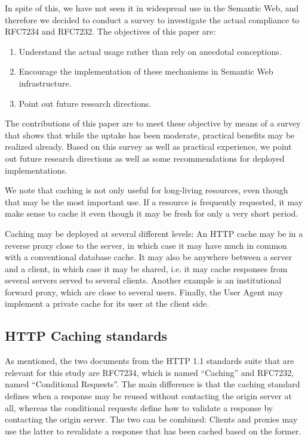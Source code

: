 \documentclass{llncs}
\begin{document}
In spite of this, we have not seen it in widespread use in the
Semantic Web, and therefore we decided to conduct a survey to
investigate the actual compliance to RFC7234 and RFC7232. 
The objectives of this paper are:
\begin{enumerate}
\item Understand the actual usage rather than rely on anecdotal
  conceptions.
\item Encourage the implementation of these mechanisms in Semantic Web
  infrastructure.
\item Point out future research directions.
\end{enumerate}
The contributions of this paper are to meet these objective by means
of a survey that shows that while the uptake has been moderate,
practical benefits may be realized already. Based on this survey as
well as practical experience, we point out future research directions
as well as some recommendations for deployed implementations.


We note that caching is not only useful for long-living 
resources, even though that may be the most important use. If a resource
is frequently requested, it may make sense to cache it even though it
may be fresh for only a very short period.

Caching may be deployed at several different levels: An HTTP cache may
be in a reverse proxy close to the server, in which case it may have
much in common with a conventional database cache. It may also be
anywhere between a server and a client, in which case it may be
shared, i.e. it may cache responses from several servers served to
several clients. Another example is an institutional forward proxy,
which are close to several users. Finally, the User Agent may
implement a private cache for its user at the client side.


\subsection{HTTP Caching standards}

As mentioned, the two documents from the HTTP 1.1 standards suite that
are relevant for this study are RFC7234, which is named ``Caching''
and RFC7232, named ``Conditional Requests''. The main difference is
that the caching standard defines when a response may be reused
without contacting the origin server at all, whereas the conditional
requests define how to validate a response by contacting the origin
server. The two can be combined: Clients and proxies may use the
latter to revalidate a response that has been cached based on the
former.
\end{document}
